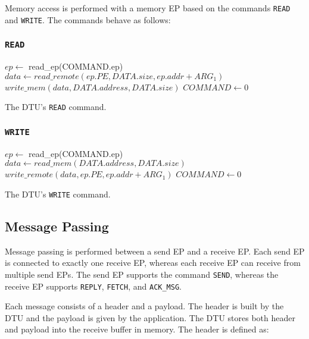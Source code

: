 \documentclass[a4paper,11pt,draft]{article}
\begin{document}
Memory access is performed with a memory EP based on the commands \texttt{READ} and \texttt{WRITE}. The commands behave as follows:

\subsubsection{\texttt{READ}}

\begin{algorithm}[H]
    $ep \gets$ read\_ep(COMMAND.ep)\;
    \BlankLine
    $data \gets read\_remote(ep.PE, DATA.size, ep.addr + ARG_1)$\;
    $write\_mem(data, DATA.address, DATA.size)$\;
    \BlankLine
    $COMMAND \gets 0$\;
    \caption{The DTU's \texttt{READ} command.}
\end{algorithm}

\subsubsection{\texttt{WRITE}}

\begin{algorithm}[H]
    $ep \gets$ read\_ep(COMMAND.ep)\;
    \BlankLine
    $data \gets read\_mem(DATA.address, DATA.size)$\;
    $write\_remote(data, ep.PE, ep.addr + ARG_1)$\;
    \BlankLine
    $COMMAND \gets 0$\;
    \caption{The DTU's \texttt{WRITE} command.}
\end{algorithm}

\subsection{Message Passing}

Message passing is performed between a send EP and a receive EP. Each send EP is connected to
exactly one receive EP, whereas each receive EP can receive from multiple send EPs. The send EP
supports the command \texttt{SEND}, whereas the receive EP supports \texttt{REPLY}, \texttt{FETCH},
and \texttt{ACK\_MSG}.

Each message consists of a header and a payload. The header is built by the DTU and the payload is
given by the application. The DTU stores both header and payload into the receive buffer in memory.
The header is defined as:
\end{document}
